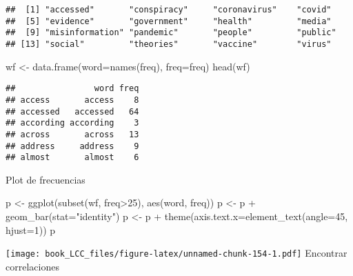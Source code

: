 \documentclass[
]{book}
\newenvironment{Shaded}{\begin{snugshade}}{\end{snugshade}}
\newcommand{\AttributeTok}[1]{\textcolor[rgb]{0.77,0.63,0.00}{#1}}
\newcommand{\DecValTok}[1]{\textcolor[rgb]{0.00,0.00,0.81}{#1}}
\newcommand{\FloatTok}[1]{\textcolor[rgb]{0.00,0.00,0.81}{#1}}
\newcommand{\FunctionTok}[1]{\textcolor[rgb]{0.00,0.00,0.00}{#1}}
\newcommand{\NormalTok}[1]{#1}
\newcommand{\OtherTok}[1]{\textcolor[rgb]{0.56,0.35,0.01}{#1}}
\newcommand{\SpecialCharTok}[1]{\textcolor[rgb]{0.00,0.00,0.00}{#1}}
\newcommand{\StringTok}[1]{\textcolor[rgb]{0.31,0.60,0.02}{#1}}
\begin{document}
\begin{verbatim}
##  [1] "accessed"       "conspiracy"     "coronavirus"    "covid"         
##  [5] "evidence"       "government"     "health"         "media"         
##  [9] "misinformation" "pandemic"       "people"         "public"        
## [13] "social"         "theories"       "vaccine"        "virus"
\end{verbatim}

\begin{Shaded}
\begin{Highlighting}[]
\NormalTok{wf }\OtherTok{\textless{}{-}} \FunctionTok{data.frame}\NormalTok{(}\AttributeTok{word=}\FunctionTok{names}\NormalTok{(freq), }\AttributeTok{freq=}\NormalTok{freq)}
\FunctionTok{head}\NormalTok{(wf)}
\end{Highlighting}
\end{Shaded}

\begin{verbatim}
##                word freq
## access       access    8
## accessed   accessed   64
## according according    3
## across       across   13
## address     address    9
## almost       almost    6
\end{verbatim}

Plot de frecuencias

\begin{Shaded}
\begin{Highlighting}[]
\NormalTok{p }\OtherTok{\textless{}{-}} \FunctionTok{ggplot}\NormalTok{(}\FunctionTok{subset}\NormalTok{(wf, freq}\SpecialCharTok{\textgreater{}}\DecValTok{25}\NormalTok{), }\FunctionTok{aes}\NormalTok{(word, freq))}
\NormalTok{p }\OtherTok{\textless{}{-}}\NormalTok{ p }\SpecialCharTok{+} \FunctionTok{geom\_bar}\NormalTok{(}\AttributeTok{stat=}\StringTok{"identity"}\NormalTok{)}
\NormalTok{p }\OtherTok{\textless{}{-}}\NormalTok{ p }\SpecialCharTok{+} \FunctionTok{theme}\NormalTok{(}\AttributeTok{axis.text.x=}\FunctionTok{element\_text}\NormalTok{(}\AttributeTok{angle=}\DecValTok{45}\NormalTok{, }\AttributeTok{hjust=}\DecValTok{1}\NormalTok{))}
\NormalTok{p}
\end{Highlighting}
\end{Shaded}

\texttt{[image: book\_LCC\_files/figure-latex/unnamed-chunk-154-1.pdf]}
Encontrar correlaciones

\begin{Shaded}
\end{Shaded}
\end{document}
